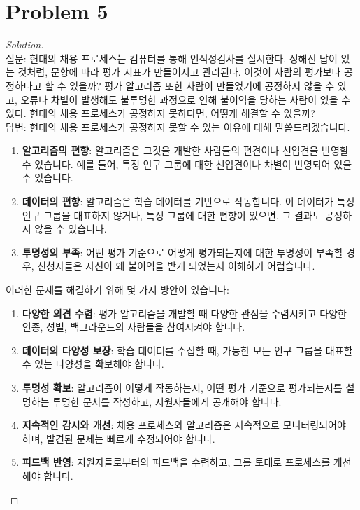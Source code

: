 \section*{Problem 5}
	\begin{proof} [Solution]
		\mbox{}\\질문: 현대의 채용 프로세스는 컴퓨터를 통해 인적성검사를 실시한다. 정해진 답이 있는 것처럼, 문항에 따라 평가 지표가 만들어지고 관리된다. 이것이 사람의 평가보다 공정하다고 할 수 있을까? 평가 알고리즘 또한 사람이 만들었기에 공정하지 않을 수 있고, 오류나 차별이 발생해도 불투명한 과정으로 인해 불이익을 당하는 사람이 있을 수 있다. 현대의 채용 프로세스가 공정하지 못하다면, 어떻게 해결할 수 있을까?\\
		
		답변: 현대의 채용 프로세스가 공정하지 못할 수 있는 이유에 대해 말씀드리겠습니다. 
		\begin{enumerate} [1.]
			\item \textbf{알고리즘의 편향}: 알고리즘은 그것을 개발한 사람들의 편견이나 선입견을 반영할 수 있습니다. 예를 들어, 특정 인구 그룹에 대한 선입견이나 차별이 반영되어 있을 수 있습니다.
			\item \textbf{데이터의 편향}: 알고리즘은 학습 데이터를 기반으로 작동합니다. 이 데이터가 특정 인구 그룹을 대표하지 않거나, 특정 그룹에 대한 편향이 있으면, 그 결과도 공정하지 않을 수 있습니다.
			\item \textbf{투명성의 부족}: 어떤 평가 기준으로 어떻게 평가되는지에 대한 투명성이 부족할 경우, 신청자들은 자신이 왜 불이익을 받게 되었는지 이해하기 어렵습니다.
		\end{enumerate}
		
		이러한 문제를 해결하기 위해 몇 가지 방안이 있습니다:
		\begin{enumerate} [1.]
			\item \textbf{다양한 의견 수렴}: 평가 알고리즘을 개발할 때 다양한 관점을 수렴시키고 다양한 인종, 성별, 백그라운드의 사람들을 참여시켜야 합니다.
			\item \textbf{데이터의 다양성 보장}: 학습 데이터를 수집할 때, 가능한 모든 인구 그룹을 대표할 수 있는 다양성을 확보해야 합니다.
			\item \textbf{투명성 확보}: 알고리즘이 어떻게 작동하는지, 어떤 평가 기준으로 평가되는지를 설명하는 투명한 문서를 작성하고, 지원자들에게 공개해야 합니다.
			\item \textbf{지속적인 감시와 개선}: 채용 프로세스와 알고리즘은 지속적으로 모니터링되어야 하며, 발견된 문제는 빠르게 수정되어야 합니다.
			\item \textbf{피드백 반영}: 지원자들로부터의 피드백을 수렴하고, 그를 토대로 프로세스를 개선해야 합니다.
		\end{enumerate}
		

\end{proof}

